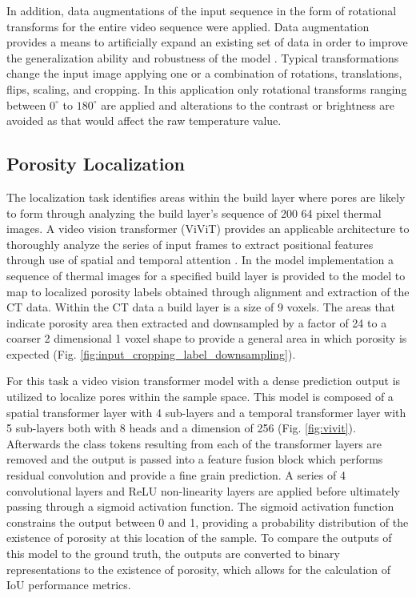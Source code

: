 In addition, data augmentations of the input sequence in the form of rotational
transforms for the entire video sequence were applied. Data augmentation
provides a means to artificially expand an existing set of data in order to
improve the generalization ability and robustness of the model
\cite{krizhevsky_imagenet_2017}. Typical transformations change the input image
applying one or a combination of rotations, translations, flips, scaling, and
cropping. In this application only rotational transforms ranging between
$0^{\circ}$ to $180^{\circ}$ are applied and alterations to the contrast or
brightness are avoided as that would affect the raw temperature value.

\subsection{Porosity Localization}
The localization task identifies areas within the build layer where pores are
likely to form through analyzing the build layer's sequence of 200 64
\texttimes{} pixel thermal images. A video vision transformer (ViViT) provides
an applicable architecture to thoroughly analyze the series of input frames to
extract positional features through use of spatial and temporal attention
\cite{arnab_vivit_2021}. In the model implementation a sequence of thermal
images for a specified build layer is provided to the model to map to localized
porosity labels obtained through alignment and extraction of the CT data. Within
the CT data a build layer is a size of 9 \texttimes{} \texttimes{} voxels.
The areas that indicate porosity area then extracted and downsampled by a factor
of 24 to a coarser 2 dimensional 1 \texttimes{} \texttimes{} voxel shape to
provide a general area in which porosity is expected (Fig.
\ref{fig:input_cropping_label_downsampling}).

For this task a video vision transformer model with a dense prediction output is
utilized to localize pores within the sample space. This model is composed of a
spatial transformer layer with 4 sub-layers and a temporal transformer layer
with 5 sub-layers both with 8 heads and a dimension of 256 (Fig.
\ref{fig:vivit}). Afterwards the class tokens resulting from each of the
transformer layers are removed and the output is passed into a feature fusion
block which performs residual convolution and provide a fine grain prediction. A
series of 4 convolutional layers and ReLU non-linearity layers are applied
before ultimately passing through a sigmoid activation function.  The sigmoid
activation function constrains the output between 0 and 1, providing a
probability distribution of the existence of porosity at this location of the
sample. To compare the outputs of this model to the ground truth, the outputs
are converted to binary representations to the existence of porosity, which
allows for the calculation of IoU performance metrics. 

